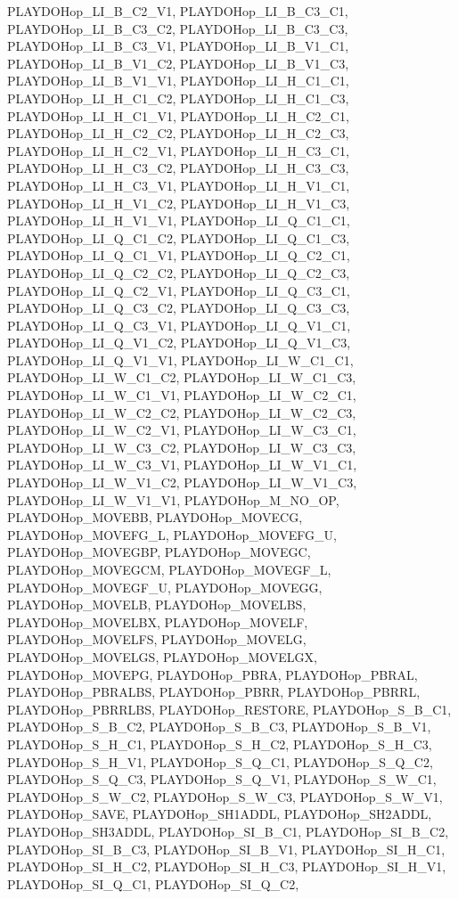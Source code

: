 PLAYDOHop\_\-LI\_\-B\_\-C2\_\-V1, PLAYDOHop\_\-LI\_\-B\_\-C3\_\-C1, PLAYDOHop\_\-LI\_\-B\_\-C3\_\-C2, PLAYDOHop\_\-LI\_\-B\_\-C3\_\-C3, PLAYDOHop\_\-LI\_\-B\_\-C3\_\-V1, PLAYDOHop\_\-LI\_\-B\_\-V1\_\-C1, PLAYDOHop\_\-LI\_\-B\_\-V1\_\-C2, PLAYDOHop\_\-LI\_\-B\_\-V1\_\-C3, PLAYDOHop\_\-LI\_\-B\_\-V1\_\-V1, PLAYDOHop\_\-LI\_\-H\_\-C1\_\-C1, PLAYDOHop\_\-LI\_\-H\_\-C1\_\-C2, PLAYDOHop\_\-LI\_\-H\_\-C1\_\-C3, PLAYDOHop\_\-LI\_\-H\_\-C1\_\-V1, PLAYDOHop\_\-LI\_\-H\_\-C2\_\-C1, PLAYDOHop\_\-LI\_\-H\_\-C2\_\-C2, PLAYDOHop\_\-LI\_\-H\_\-C2\_\-C3, PLAYDOHop\_\-LI\_\-H\_\-C2\_\-V1, PLAYDOHop\_\-LI\_\-H\_\-C3\_\-C1, PLAYDOHop\_\-LI\_\-H\_\-C3\_\-C2, PLAYDOHop\_\-LI\_\-H\_\-C3\_\-C3, PLAYDOHop\_\-LI\_\-H\_\-C3\_\-V1, PLAYDOHop\_\-LI\_\-H\_\-V1\_\-C1, PLAYDOHop\_\-LI\_\-H\_\-V1\_\-C2, PLAYDOHop\_\-LI\_\-H\_\-V1\_\-C3, PLAYDOHop\_\-LI\_\-H\_\-V1\_\-V1, PLAYDOHop\_\-LI\_\-Q\_\-C1\_\-C1, PLAYDOHop\_\-LI\_\-Q\_\-C1\_\-C2, PLAYDOHop\_\-LI\_\-Q\_\-C1\_\-C3, PLAYDOHop\_\-LI\_\-Q\_\-C1\_\-V1, PLAYDOHop\_\-LI\_\-Q\_\-C2\_\-C1, PLAYDOHop\_\-LI\_\-Q\_\-C2\_\-C2, PLAYDOHop\_\-LI\_\-Q\_\-C2\_\-C3, PLAYDOHop\_\-LI\_\-Q\_\-C2\_\-V1, PLAYDOHop\_\-LI\_\-Q\_\-C3\_\-C1, PLAYDOHop\_\-LI\_\-Q\_\-C3\_\-C2, PLAYDOHop\_\-LI\_\-Q\_\-C3\_\-C3, PLAYDOHop\_\-LI\_\-Q\_\-C3\_\-V1, PLAYDOHop\_\-LI\_\-Q\_\-V1\_\-C1, PLAYDOHop\_\-LI\_\-Q\_\-V1\_\-C2, PLAYDOHop\_\-LI\_\-Q\_\-V1\_\-C3, PLAYDOHop\_\-LI\_\-Q\_\-V1\_\-V1, PLAYDOHop\_\-LI\_\-W\_\-C1\_\-C1, PLAYDOHop\_\-LI\_\-W\_\-C1\_\-C2, PLAYDOHop\_\-LI\_\-W\_\-C1\_\-C3, PLAYDOHop\_\-LI\_\-W\_\-C1\_\-V1, PLAYDOHop\_\-LI\_\-W\_\-C2\_\-C1, PLAYDOHop\_\-LI\_\-W\_\-C2\_\-C2, PLAYDOHop\_\-LI\_\-W\_\-C2\_\-C3, PLAYDOHop\_\-LI\_\-W\_\-C2\_\-V1, PLAYDOHop\_\-LI\_\-W\_\-C3\_\-C1, PLAYDOHop\_\-LI\_\-W\_\-C3\_\-C2, PLAYDOHop\_\-LI\_\-W\_\-C3\_\-C3, PLAYDOHop\_\-LI\_\-W\_\-C3\_\-V1, PLAYDOHop\_\-LI\_\-W\_\-V1\_\-C1, PLAYDOHop\_\-LI\_\-W\_\-V1\_\-C2, PLAYDOHop\_\-LI\_\-W\_\-V1\_\-C3, PLAYDOHop\_\-LI\_\-W\_\-V1\_\-V1, PLAYDOHop\_\-M\_\-NO\_\-OP, PLAYDOHop\_\-MOVEBB, PLAYDOHop\_\-MOVECG, PLAYDOHop\_\-MOVEFG\_\-L, PLAYDOHop\_\-MOVEFG\_\-U, PLAYDOHop\_\-MOVEGBP, PLAYDOHop\_\-MOVEGC, PLAYDOHop\_\-MOVEGCM, PLAYDOHop\_\-MOVEGF\_\-L, PLAYDOHop\_\-MOVEGF\_\-U, PLAYDOHop\_\-MOVEGG, PLAYDOHop\_\-MOVELB, PLAYDOHop\_\-MOVELBS, PLAYDOHop\_\-MOVELBX, PLAYDOHop\_\-MOVELF, PLAYDOHop\_\-MOVELFS, PLAYDOHop\_\-MOVELG, PLAYDOHop\_\-MOVELGS, PLAYDOHop\_\-MOVELGX, PLAYDOHop\_\-MOVEPG, PLAYDOHop\_\-PBRA, PLAYDOHop\_\-PBRAL, PLAYDOHop\_\-PBRALBS, PLAYDOHop\_\-PBRR, PLAYDOHop\_\-PBRRL, PLAYDOHop\_\-PBRRLBS, PLAYDOHop\_\-RESTORE, PLAYDOHop\_\-S\_\-B\_\-C1, PLAYDOHop\_\-S\_\-B\_\-C2, PLAYDOHop\_\-S\_\-B\_\-C3, PLAYDOHop\_\-S\_\-B\_\-V1, PLAYDOHop\_\-S\_\-H\_\-C1, PLAYDOHop\_\-S\_\-H\_\-C2, PLAYDOHop\_\-S\_\-H\_\-C3, PLAYDOHop\_\-S\_\-H\_\-V1, PLAYDOHop\_\-S\_\-Q\_\-C1, PLAYDOHop\_\-S\_\-Q\_\-C2, PLAYDOHop\_\-S\_\-Q\_\-C3, PLAYDOHop\_\-S\_\-Q\_\-V1, PLAYDOHop\_\-S\_\-W\_\-C1, PLAYDOHop\_\-S\_\-W\_\-C2, PLAYDOHop\_\-S\_\-W\_\-C3, PLAYDOHop\_\-S\_\-W\_\-V1, PLAYDOHop\_\-SAVE, PLAYDOHop\_\-SH1ADDL, PLAYDOHop\_\-SH2ADDL, PLAYDOHop\_\-SH3ADDL, PLAYDOHop\_\-SI\_\-B\_\-C1, PLAYDOHop\_\-SI\_\-B\_\-C2, PLAYDOHop\_\-SI\_\-B\_\-C3, PLAYDOHop\_\-SI\_\-B\_\-V1, PLAYDOHop\_\-SI\_\-H\_\-C1, PLAYDOHop\_\-SI\_\-H\_\-C2, PLAYDOHop\_\-SI\_\-H\_\-C3, PLAYDOHop\_\-SI\_\-H\_\-V1, PLAYDOHop\_\-SI\_\-Q\_\-C1, PLAYDOHop\_\-SI\_\-Q\_\-C2, 